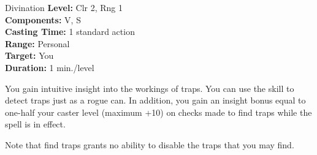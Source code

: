 {Divination}
{
	\textbf{Level:}
	Clr 2, Rng 1\\
	\textbf{Components:}
	V, S\\
	\textbf{Casting Time:}
	1 standard action\\
	\textbf{Range:}
	Personal\\
	\textbf{Target:}
	You\\
	\textbf{Duration:}
	1 min./level\\
}
{
	You gain intuitive insight into the workings of traps. You can use the  skill to detect traps just as a rogue can. In addition, you gain an insight bonus equal to one-half your caster level (maximum +10) on  checks made to find traps while the spell is in effect.

	Note that find traps grants no ability to disable the traps that you may find.

}
